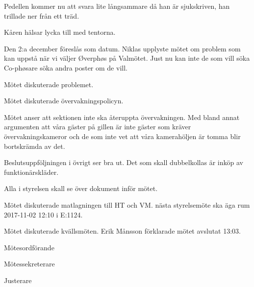 \documentclass[10pt]{article}
\def\mo{Erik Månsson}
\def\ms{Johan Karlberg}
\def\ji{Niklas Gustafson}
\begin{document}
\begin{paragrafer}
\begin{paragrafer}
Pedellen kommer nu att svara lite långsammare då han är sjukskriven, han trillade ner från ett träd.

Kåren hälsar lycka till med tentorna.
\end{paragrafer}

Den 2:a december föreslås som datum.
Niklas upplyste mötet om problem som kan uppstå när vi väljer Øverphøs på Valmötet. Just nu kan inte de som vill söka Co-phøsare söka andra poster om de vill.

Mötet diskuterade problemet.

Mötet diskuterade övervakningspolicyn.

Mötet anser att sektionen inte ska återuppta övervakningen. Med bland annat argumenten att våra gäster på gillen är inte gäster som kräver övervakningskameror och de som inte vet att våra kamerahöljen är tomma blir bortskrämda av det.

Beslutsuppföljningen i övrigt ser bra ut. Det som skall dubbelkollas är inköp av funktionärskläder.

Alla i styrelsen skall se över dokument inför mötet.

Mötet diskuterade matlagningen till HT och VM.
{\Mba} nästa styrelsemöte ska äga rum 2017-11-02 12:10 i E:1124.

{\Ibfu}

Mötet diskuterade kvällsmöten.
{\mo} förklarade mötet avslutat 13:03.

\end{paragrafer}

\hidesignfoot
\begin{signatures}{3}
\signature{\mo}{Mötesordförande}
\signature{\ms}{Mötessekreterare}
\signature{\ji}{Justerare}
\end{signatures}
\end{document}
